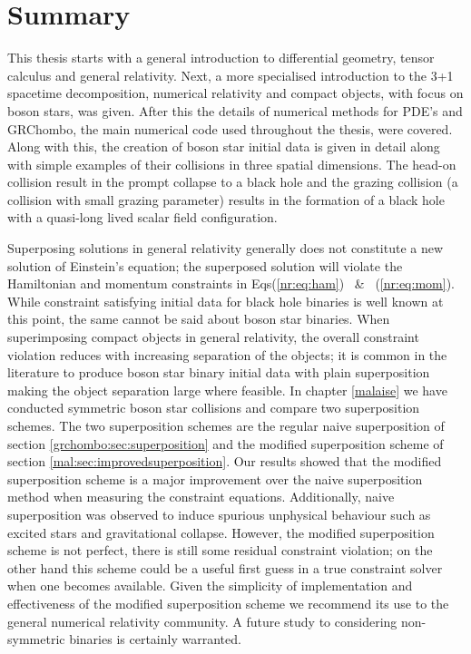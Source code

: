 \section{Summary}

This thesis starts with a general introduction to differential geometry,
tensor calculus and general relativity. Next, a more specialised introduction to the
3+1 spacetime decomposition, numerical relativity and compact objects, with focus
on boson stars, was given. After this the details of
numerical methods for PDE's and {\sc GRChombo}, the main numerical code used throughout
the thesis, were covered. Along with this, the creation of boson star initial data is given in
detail along with simple examples of their collisions in three spatial dimensions.
The head-on collision result in the prompt collapse to a black hole and the grazing
collision (a collision with small grazing parameter) results in the formation of
a black hole with a quasi-long lived scalar field configuration.

Superposing solutions in general relativity generally does not constitute a new
solution of Einstein's equation; the superposed solution will violate the Hamiltonian
and momentum constraints in Eqs(\ref{nr:eq:ham}) \, \& \, (\ref{nr:eq:mom}). While
constraint satisfying initial data for black hole binaries is well known at this point,
the same cannot be said about boson star binaries. When superimposing
compact objects in general relativity, the overall constraint violation reduces with
increasing separation of the objects; it is common in the literature to produce
boson star binary initial data with plain superposition making the object separation
large where feasible. In chapter \ref{malaise} we have conducted symmetric boson
star collisions and compare two superposition schemes. The two superposition schemes
are the regular naive superposition of section \ref{grchombo:sec:superposition}
and the modified superposition scheme of section \ref{mal:sec:improvedsuperposition}.
Our results showed that the modified superposition scheme is a major improvement
over the naive superposition method when measuring the constraint equations. Additionally,
naive superposition was observed to induce spurious unphysical behaviour such as
excited stars and gravitational collapse. However, the modified superposition
scheme is not perfect, there is still some residual constraint violation; on the
other hand this scheme could be a useful first guess in a true constraint solver
when one becomes available. Given the simplicity of implementation and
effectiveness of the modified superposition scheme we recommend its use to the
general numerical relativity community. A future study to considering non-symmetric
binaries is certainly warranted.

